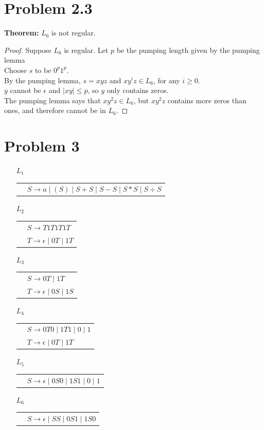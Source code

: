 \documentclass{article}
\newenvironment{problem}[1]{
  \nobreak\section*{Problem #1}
}{}
\begin{document}
  \begin{problem}{2.3}
    \textbf{Theorem:} $L_6$ is not regular.
    \begin{proof}
      Suppose $L_6$ is regular.  Let $p$ be the pumping length given by the
      pumping lemma\\
      Choose $s$ to be $0^p1^p$.\\
      By the pumping lemma, $s = xyz$ and $xy^iz \in L_6$, for
      any $i \ge 0$.\\
      $y$ cannot be $\epsilon$ and $|xy| \le p$, so $y$ only contains zeros.\\
      The pumping lemma says that $xy^2z \in L_6$, but $xy^2z$ contains more
      zeros than ones, and therefore cannot be in $L_6$.
    \end{proof}
  \end{problem}

  \begin{problem}{3}
    \begin{enumerate}
      \item[$L_1$] \begin{tabular}{rl}
        & $S \to a \mid (S) \mid S + S \mid S - S \mid S * S \mid S \div S$
      \end{tabular}

      \item[$L_2$] \begin{tabular}{rl}
        & $S \to T1T1T1T$\\
        & $T \to \epsilon \mid 0T \mid 1T$
      \end{tabular}

      \item[$L_3$] \begin{tabular}{rl}
        & $S \to 0T \mid 1T$\\
        & $T \to \epsilon \mid 0S \mid 1S$
      \end{tabular}

      \item[$L_4$] \begin{tabular}{rl}
        & $S \to 0T0 \mid 1T1 \mid 0 \mid 1$\\
        & $T \to \epsilon \mid 0T \mid 1T$
      \end{tabular}

      \item[$L_5$] \begin{tabular}{rl}
        & $S \to \epsilon \mid 0S0 \mid 1S1 \mid 0 \mid 1$
      \end{tabular}

      \item[$L_6$] \begin{tabular}{rl}
        & $S \to \epsilon \mid SS \mid 0S1 \mid 1S0$
      \end{tabular}
    \end{enumerate}
  \end{problem}
\end{document}
